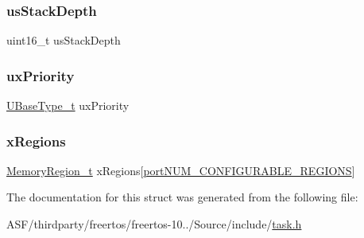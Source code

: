 \subsubsection{\texorpdfstring{usStackDepth}{usStackDepth}}
{\footnotesize\ttfamily uint16\+\_\+t us\+Stack\+Depth}

\mbox{\label{structx_t_a_s_k___p_a_r_a_m_e_t_e_r_s_a0befed3dd0fe55b4314158f4814f50ae}} 
\subsubsection{\texorpdfstring{uxPriority}{uxPriority}}
{\footnotesize\ttfamily \mbox{\hyperlink{portmacro_8h_a646f89d4298e4f5afd522202b11cb2e6}{U\+Base\+Type\+\_\+t}} ux\+Priority}

\mbox{\label{structx_t_a_s_k___p_a_r_a_m_e_t_e_r_s_a7bc9c069ce3a5e929c7ef29e95184584}} 
\subsubsection{\texorpdfstring{xRegions}{xRegions}}
{\footnotesize\ttfamily \mbox{\hyperlink{task_8h_af609504de4d78ff6f71477ae47c66e51}{Memory\+Region\+\_\+t}} x\+Regions\mbox{[}\mbox{\hyperlink{portable_8h_aca7e1a8a568a38b74cc9db10c8efebda}{port\+N\+U\+M\+\_\+\+C\+O\+N\+F\+I\+G\+U\+R\+A\+B\+L\+E\+\_\+\+R\+E\+G\+I\+O\+NS}}\mbox{]}}



The documentation for this struct was generated from the following file\+:\begin{DoxyCompactItemize}
\item 
A\+S\+F/thirdparty/freertos/freertos-\/10../\+Source/include/\mbox{\hyperlink{task_8h}{task.\+h}}\end{DoxyCompactItemize}
